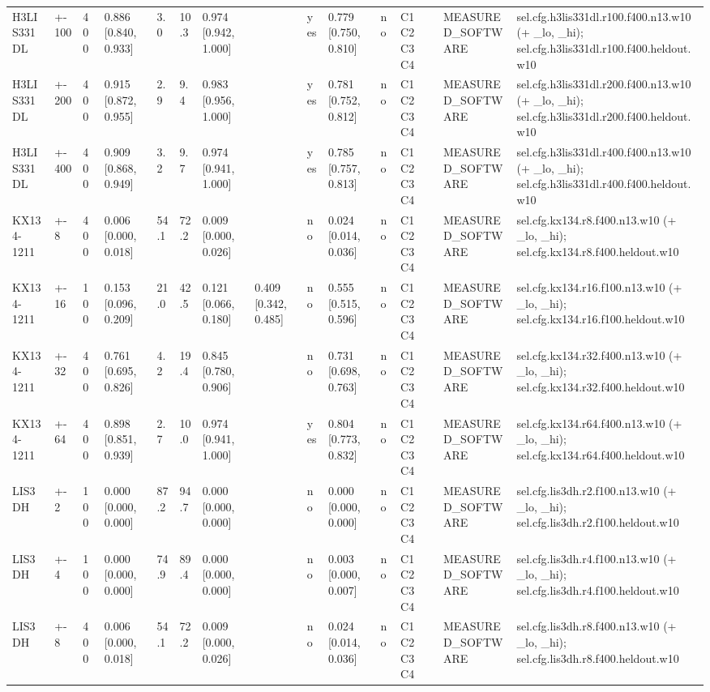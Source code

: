 \begin{table}[t]
\begin{tabular}{llllllllllllll}
H3LIS331DL & +-100 & 400 & 0.886 [0.840, 0.933] & 3.0 & 10.3 & 0.974 [0.942, 1.000] &  & yes & 0.779 [0.750, 0.810] & no & C1 C2 C3 C4 & MEASURED\_SOFTWARE & sel.cfg.h3lis331dl.r100.f400.n13.w10 (+ \_lo, \_hi); sel.cfg.h3lis331dl.r100.f400.heldout.w10 \\
H3LIS331DL & +-200 & 400 & 0.915 [0.872, 0.955] & 2.9 & 9.4 & 0.983 [0.956, 1.000] &  & yes & 0.781 [0.752, 0.812] & no & C1 C2 C3 C4 & MEASURED\_SOFTWARE & sel.cfg.h3lis331dl.r200.f400.n13.w10 (+ \_lo, \_hi); sel.cfg.h3lis331dl.r200.f400.heldout.w10 \\
H3LIS331DL & +-400 & 400 & 0.909 [0.868, 0.949] & 3.2 & 9.7 & 0.974 [0.941, 1.000] &  & yes & 0.785 [0.757, 0.813] & no & C1 C2 C3 C4 & MEASURED\_SOFTWARE & sel.cfg.h3lis331dl.r400.f400.n13.w10 (+ \_lo, \_hi); sel.cfg.h3lis331dl.r400.f400.heldout.w10 \\
KX134-1211 & +-8 & 400 & 0.006 [0.000, 0.018] & 54.1 & 72.2 & 0.009 [0.000, 0.026] &  & no & 0.024 [0.014, 0.036] & no & C1 C2 C3 C4 & MEASURED\_SOFTWARE & sel.cfg.kx134.r8.f400.n13.w10 (+ \_lo, \_hi); sel.cfg.kx134.r8.f400.heldout.w10 \\
KX134-1211 & +-16 & 100 & 0.153 [0.096, 0.209] & 21.0 & 42.5 & 0.121 [0.066, 0.180] & 0.409 [0.342, 0.485] & no & 0.555 [0.515, 0.596] & no & C1 C2 C3 C4 & MEASURED\_SOFTWARE & sel.cfg.kx134.r16.f100.n13.w10 (+ \_lo, \_hi); sel.cfg.kx134.r16.f100.heldout.w10 \\
KX134-1211 & +-32 & 400 & 0.761 [0.695, 0.826] & 4.2 & 19.4 & 0.845 [0.780, 0.906] &  & no & 0.731 [0.698, 0.763] & no & C1 C2 C3 C4 & MEASURED\_SOFTWARE & sel.cfg.kx134.r32.f400.n13.w10 (+ \_lo, \_hi); sel.cfg.kx134.r32.f400.heldout.w10 \\
KX134-1211 & +-64 & 400 & 0.898 [0.851, 0.939] & 2.7 & 10.0 & 0.974 [0.941, 1.000] &  & yes & 0.804 [0.773, 0.832] & no & C1 C2 C3 C4 & MEASURED\_SOFTWARE & sel.cfg.kx134.r64.f400.n13.w10 (+ \_lo, \_hi); sel.cfg.kx134.r64.f400.heldout.w10 \\
LIS3DH & +-2 & 100 & 0.000 [0.000, 0.000] & 87.2 & 94.7 & 0.000 [0.000, 0.000] &  & no & 0.000 [0.000, 0.000] & no & C1 C2 C3 C4 & MEASURED\_SOFTWARE & sel.cfg.lis3dh.r2.f100.n13.w10 (+ \_lo, \_hi); sel.cfg.lis3dh.r2.f100.heldout.w10 \\
LIS3DH & +-4 & 100 & 0.000 [0.000, 0.000] & 74.9 & 89.4 & 0.000 [0.000, 0.000] &  & no & 0.003 [0.000, 0.007] & no & C1 C2 C3 C4 & MEASURED\_SOFTWARE & sel.cfg.lis3dh.r4.f100.n13.w10 (+ \_lo, \_hi); sel.cfg.lis3dh.r4.f100.heldout.w10 \\
LIS3DH & +-8 & 400 & 0.006 [0.000, 0.018] & 54.1 & 72.2 & 0.009 [0.000, 0.026] &  & no & 0.024 [0.014, 0.036] & no & C1 C2 C3 C4 & MEASURED\_SOFTWARE & sel.cfg.lis3dh.r8.f400.n13.w10 (+ \_lo, \_hi); sel.cfg.lis3dh.r8.f400.heldout.w10 \\

\end{tabular}
\end{table}
